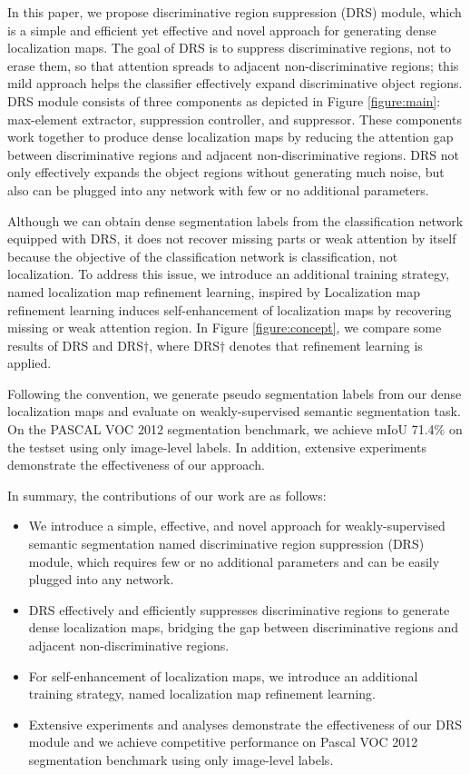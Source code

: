 \documentclass[letterpaper]{article} \usepackage{aaai21}  \usepackage{times}  \usepackage{helvet} \usepackage{courier}  \usepackage[hyphens]{url}  \usepackage{graphicx} \urlstyle{rm} \def\UrlFont{\rm}  \usepackage{natbib}  \usepackage{caption} \frenchspacing  \setlength{\pdfpagewidth}{8.5in}  \setlength{\pdfpageheight}{11in}
\begin{document}
In this paper, we propose discriminative region suppression (DRS) module, which is a simple and efficient yet effective and novel approach for generating dense localization maps.
The goal of DRS is to suppress discriminative regions, not to erase them, so that attention spreads to adjacent non-discriminative regions; this mild approach helps the classifier effectively expand discriminative object regions.
DRS module consists of three components as depicted in Figure \ref{figure:main}: max-element extractor, suppression controller, and suppressor.
These components work together to produce dense localization maps by reducing the attention gap between discriminative regions and adjacent non-discriminative regions.
DRS not only effectively expands the object regions without generating much noise, but also can be plugged into any network with few or no additional parameters.

Although we can obtain dense segmentation labels from the classification network equipped with DRS, it does not recover missing parts or weak attention by itself because the objective of the classification network is classification, not localization.
To address this issue, we introduce an additional training strategy, named localization map refinement learning, inspired by \cite{jiang2019integral}
Localization map refinement learning induces self-enhancement of localization maps by recovering missing or weak attention region.
In Figure \ref{figure:concept}, we compare some results of DRS and DRS$\dagger$, where DRS$\dagger$ denotes that refinement learning is applied.

Following the convention, we generate pseudo segmentation labels from our dense localization maps and evaluate on weakly-supervised semantic segmentation task.
On the PASCAL VOC 2012 segmentation benchmark, we achieve mIoU 71.4\% on the testset using only image-level labels.
In addition, extensive experiments demonstrate the effectiveness of our approach.

In summary, the contributions of our work are as follows:
\begin{itemize}
\item We introduce a simple, effective, and novel approach for weakly-supervised semantic segmentation named discriminative region suppression (DRS) module, which requires few or no additional parameters and can be easily plugged into any network.
\item DRS effectively and efficiently suppresses discriminative regions to generate dense localization maps, bridging the gap between discriminative regions and adjacent non-discriminative regions. 
\item For self-enhancement of localization maps, we introduce an additional training strategy, named localization map refinement learning.
\item Extensive experiments and analyses demonstrate the effectiveness of our DRS module and we achieve competitive performance on Pascal VOC 2012 segmentation benchmark using only image-level labels.
\end{itemize}
\end{document}
